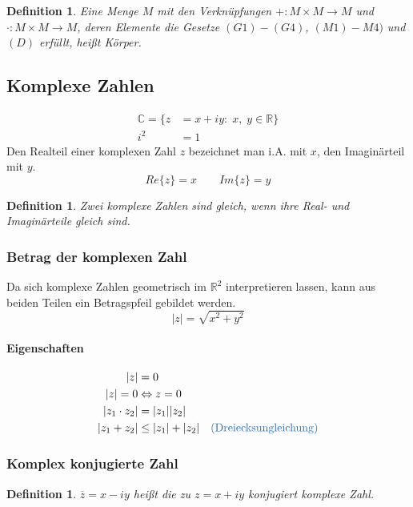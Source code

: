 \documentclass[12pt,a4paper]{report}%
\newtheorem{definition}[satz]{Definition}
\numberwithin{equation}{section}
\newcommand{\R}{\mathbb{R}} %
\newcommand{\C}{\mathbb{C}}
\newcommand{\subsubsubsection}{\paragraph}
\def\colBlue#1{\begingroup\color{NavyBlue}{#1}\endgroup}
\numberwithin{equation}{subsection}
\begin{document}
      \begin{definition} 
        \glqq Eine Menge $M$ mit den Verknüpfungen $+:M\times M  \rightarrow M$ und $\cdot: M\times M \rightarrow M$, deren Elemente die Gesetze $(G1) - (G4)$, $(M1) - M4)$ und $(D)$ erfüllt, heißt Körper.\grqq \cite{HM12}
      \end{definition}
		
	\subsection{Komplexe Zahlen}
	\begin{align}
		\C = \{ z &= x + iy:\; x,\;y \in \R \}\\
		i^2 &= 1
	\end{align}
	Den Realteil einer komplexen Zahl $z$ bezeichnet man i.A. mit $x$, den Imaginärteil mit $y$.
	\begin{equation}
	  Re\{z\} = x \qquad Im\{z\} = y
	\end{equation}
	
	\begin{definition} 
	  \glqq Zwei komplexe Zahlen sind gleich, wenn ihre Real- und Imaginärteile gleich sind. \grqq \cite{HM12}
	\end{definition}
	
		\subsubsection{Betrag der komplexen Zahl}
		Da sich komplexe Zahlen geometrisch im $\R^2$ interpretieren lassen, kann aus beiden Teilen ein Betragspfeil gebildet werden.
		\begin{equation}
		  |z| = \sqrt{x^2 + y^2}
		\end{equation}
		
		\subsubsubsection{Eigenschaften}
  	\begin{align}
		  |z| &= 0\\
			|z| = 0 &\Leftrightarrow z = 0\\
			|z_1 \cdot z_2| &= |z_1| |z_2|\\
			|z_1 + z_2| &\leq |z_1| + |z_2| \quad \text{\colBlue{(Dreiecksungleichung)}}
		\end{align}
		
		\subsubsection{Komplex konjugierte Zahl}
		\begin{definition} 
		  \glqq $\overline{z} = x -iy$ heißt die zu $z = x + iy$ konjugiert komplexe Zahl. \grqq \cite{HM12}
		\end{definition}
		
\end{document}
